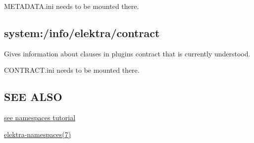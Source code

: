 {\ttfamily M\+E\+T\+A\+D\+A\+T\+A.\+ini} needs to be mounted there.\hypertarget{doc_help_elektra-hierarchy_md_autotoc_md2551}{}\subsection{system\+:/info/elektra/contract}\label{doc_help_elektra-hierarchy_md_autotoc_md2551}
Gives information about clauses in plugin\textquotesingle{}s contract that is currently understood.

{\ttfamily C\+O\+N\+T\+R\+A\+C\+T.\+ini} needs to be mounted there.\hypertarget{doc_help_elektra-hierarchy_md_autotoc_md2552}{}\subsection{S\+E\+E A\+L\+SO}\label{doc_help_elektra-hierarchy_md_autotoc_md2552}

\begin{DoxyItemize}
\item \hyperlink{doc_tutorials_namespaces_md}{see namespaces tutorial}
\item \hyperlink{doc_help_elektra-namespaces_md}{elektra-\/namespaces(7)} 
\end{DoxyItemize}